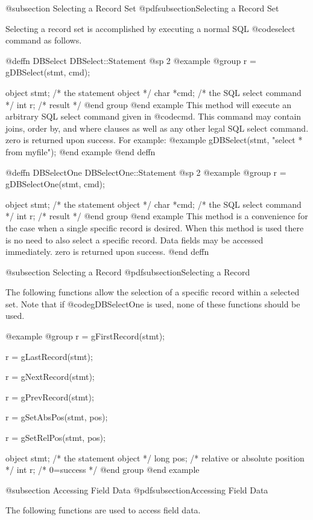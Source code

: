 @subsection Selecting a Record Set
@pdfsubsection{Selecting a Record Set}

Selecting a record set is accomplished by executing a normal SQL
@code{select} command as follows.

@deffn {DBSelect}  DBSelect::Statement
@sp 2
@example
@group
r = gDBSelect(stmt, cmd);

object  stmt;   /*  the statement object    */
char    *cmd;   /*  the SQL select command  */
int     r;      /*  result                  */
@end group
@end example
This method will execute an arbitrary SQL select command given in @code{cmd}.  This command may contain joins,
order by, and where clauses as well as any other legal SQL select command. zero is returned upon success.  For example:  
@example
gDBSelect(stmt, "select * from myfile");
@end example
@end deffn

@deffn {DBSelectOne}  DBSelectOne::Statement
@sp 2
@example
@group
r = gDBSelectOne(stmt, cmd);

object  stmt;   /*  the statement object    */
char    *cmd;   /*  the SQL select command  */
int     r;      /*  result                  */
@end group
@end example
This method is a convenience for the case when a single specific record
is desired.  When this method is used there is no need to also select a
specific record.  Data fields may be accessed immediately.  zero is
returned upon success.  
@end deffn


@subsection Selecting a Record
@pdfsubsection{Selecting a Record}

The following functions allow the selection of a specific record within a
selected set.  Note that if @code{gDBSelectOne} is used, none of these
functions should be used.

@example
@group
r = gFirstRecord(stmt);

r = gLastRecord(stmt);

r = gNextRecord(stmt);

r = gPrevRecord(stmt);

r = gSetAbsPos(stmt, pos);

r = gSetRelPos(stmt, pos);

object  stmt;   /*  the statement object           */
long    pos;    /*  relative or absolute position  */
int     r;      /*  0=success                      */
@end group
@end example


@subsection Accessing Field Data
@pdfsubsection{Accessing Field Data}

The following functions are used to access field data.

